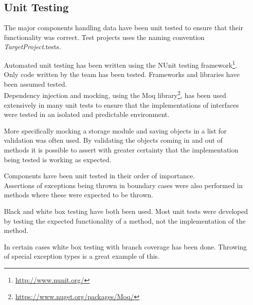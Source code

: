 \subsection{\label{sec:UnitTesting}Unit Testing}
The major components handling data have been unit tested to ensure that their functionality was correct. Test projects uses the naming convention \textit{TargetProject}.tests.

Automated unit testing has been written using the NUnit testing framework\footnote{\url{http://www.nunit.org/}}. Only code written by the team has been tested. Frameworks and libraries have been assumed tested. \\

Dependency injection and mocking, using the Moq library\footnote{\url{https://www.nuget.org/packages/Moq/}}, has been used extensively in many unit tests to ensure that the implementations of interfaces were tested in an isolated and predictable environment.

More specifically mocking a storage module and saving objects in a list for validation was often used. By validating the objects coming in and out of methods it is possible to assert with greater certainty that the implementation being tested is working as expected.

Components have been unit tested in their order of importance. \\

Assertions of exceptions being thrown in boundary cases were also performed in methods where these were expected to be thrown.

Black and white box testing have both been used. Most unit tests were developed by testing the expected functionality of a method, not the implementation of the method. 

In certain cases white box testing with branch coverage has been done. Throwing of special exception types is a great example of this.